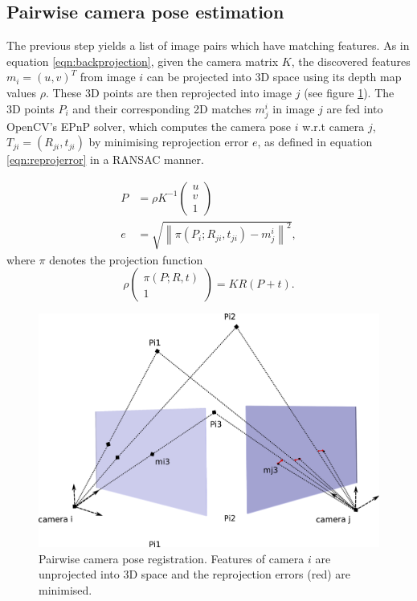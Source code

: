 \documentclass[10pt,twocolumn,letterpaper]{article}
\newcommand{\norm}[1]{\left\lVert #1 \right\rVert}
\begin{document}
\subsection{Pairwise camera pose estimation}

The previous step yields a list of image pairs which have matching features.
As in equation \ref{eqn:backprojection}, given the camera matrix $K$, the discovered features $m_{i} = (u,v)^{T}$ from image $i$ can be projected into 3D space
using its depth map values $\rho$. These 3D points are then reprojected into image $j$ (see figure \ref{fig:reg}). The 3D points $P_{i}$ and their corresponding 2D matches $m^i_{j}$ in image $j$ are fed into OpenCV's EPnP solver, which computes the camera pose $i$ w.r.t camera $j$, $T_{ji} = \left(R_{ji}, t_{ji}\right)$ by minimising reprojection error $e$, as defined in equation \ref{eqn:reprojerror} in a RANSAC manner.

\begin{align}
P &= \rho K^{-1} \begin{pmatrix}
u\\v\\1
\end{pmatrix} \label{eqn:backprojection}\\
e &= \sqrt{\norm{\pi\left(P_{i};R_{ji},t_{ji}\right)-m^i_{j}}^2},\label{eqn:reprojerror}
\end{align}
where $\pi$ denotes the projection function \[
\rho
\begin{pmatrix}
\pi\left(P;R,t\right)\\1
\end{pmatrix} = KR\left(P+t\right).
\]


\begin{figure}[t]
\begin{center}
   \includegraphics[width=0.9\linewidth]{figures/registration.pdf}
\end{center}
\caption{Pairwise camera pose registration. Features of camera $i$ are unprojected into 3D space and the reprojection errors (red) are minimised.}
\label{fig:reg}
\end{figure}
\end{document}
